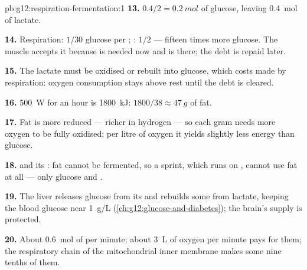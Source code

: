 \begin{solution}{pb:g12:respiration-fermentation:1}
\textbf{13.} $0.4/2 = \qty{0.2}{mol}$ of glucose, leaving \qty{0.4}{mol}
of lactate.

\textbf{14.} Respiration: $1/30$ glucose per ; : $1/2$
--- fifteen times more glucose. The muscle accepts it because  is
needed now and  is there; the debt is repaid later.

\textbf{15.} The lactate must be oxidised or rebuilt into glucose,
which costs  made by respiration: oxygen consumption stays above
rest until the debt is cleared.

\textbf{16.} \qty{500}{W} for an hour is \qty{1800}{kJ}: $1800/38
\approx \qty{47}{g}$ of fat.

\textbf{17.} Fat is more reduced --- richer in hydrogen --- so each
gram needs more oxygen to be fully oxidised; per litre of oxygen it
yields slightly less energy than glucose.

\textbf{18.}  and its : fat cannot be fermented,
so a sprint, which runs on , cannot use fat at all --- only
glucose and .

\textbf{19.} The liver releases glucose from its  and rebuilds
some from lactate, keeping the blood glucose near \qty{1}{g/L}
(\cref{ch:g12:glucose-and-diabetes}); the brain's supply is
protected.

\textbf{20.} About \qty{0.6}{mol} of  per minute; about
\qty{3}{L} of oxygen per minute pays for them; the respiratory chain
of the mitochondrial inner membrane makes some nine tenths of them.
\end{solution}
